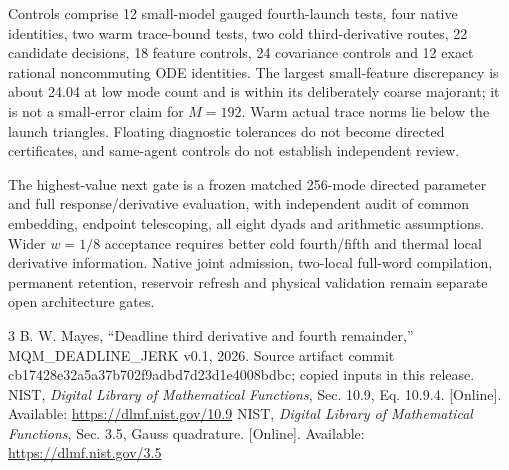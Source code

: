 \documentclass[a4paper,conference]{IEEEtran}
\begin{document}
Controls comprise 12 small-model gauged fourth-launch tests, four native identities, two warm trace-bound tests, two cold third-derivative routes, 22 candidate decisions, 18 feature controls, 24 covariance controls and 12 exact rational noncommuting ODE identities. The largest small-feature discrepancy is about 24.04 at low mode count and is within its deliberately coarse majorant; it is not a small-error claim for $M=192$. Warm actual trace norms lie below the launch triangles. Floating diagnostic tolerances do not become directed certificates, and same-agent controls do not establish independent review.

The highest-value next gate is a frozen matched 256-mode directed parameter and full response/derivative evaluation, with independent audit of common embedding, endpoint telescoping, all eight dyads and arithmetic assumptions. Wider $w=1/8$ acceptance requires better cold fourth/fifth and thermal local derivative information. Native joint admission, two-local full-word compilation, permanent retention, reservoir refresh and physical validation remain separate open architecture gates.
\begin{thebibliography}{3}
 B. W. Mayes, ``Deadline third derivative and fourth remainder,'' MQM\_DEADLINE\_JERK v0.1, 2026. Source artifact commit cb17428e32a5a37b702f9adbd7d23d1e4008bdbc; copied inputs in this release.
 NIST, \emph{Digital Library of Mathematical Functions}, Sec. 10.9, Eq. 10.9.4. [Online]. Available: \url{https://dlmf.nist.gov/10.9}
 NIST, \emph{Digital Library of Mathematical Functions}, Sec. 3.5, Gauss quadrature. [Online]. Available: \url{https://dlmf.nist.gov/3.5}
\end{thebibliography}
\end{document}
